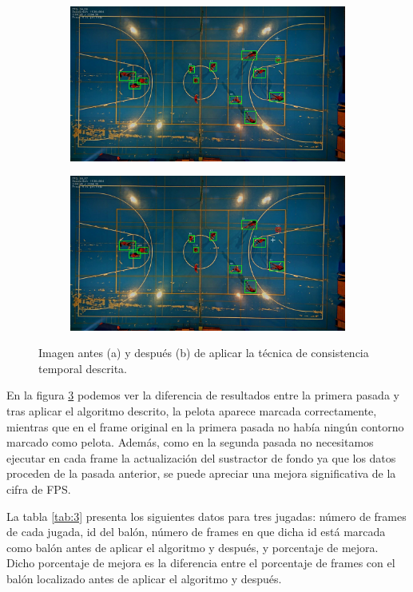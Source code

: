 \begin{figure}
\begin{subfigure}{.5\textwidth}
  \centering
  \includegraphics[width=.9\linewidth]{images/noconsistencia}
  \caption { }
  \label{fig:consa}
\end{subfigure}%
\begin{subfigure}{.5\textwidth}
  \centering
  \includegraphics[width=.9\linewidth]{images/consistencia}
  \caption { }
  \label{fig:consb}
\end{subfigure}
\caption{Imagen antes (a) y después (b) de aplicar la técnica de consistencia temporal descrita.}
\label{fig:cons}
\end{figure}

En la figura \ref{fig:cons} podemos ver la diferencia de resultados entre la primera pasada y tras aplicar el algoritmo descrito, la pelota aparece marcada correctamente, mientras que en el frame original en la primera pasada no había ningún contorno marcado como pelota. Además, como en la segunda pasada no necesitamos ejecutar en cada frame la actualización del sustractor de fondo ya que los datos proceden de la pasada anterior, se puede apreciar una mejora significativa de la cifra de FPS.

La tabla \ref{tab:3} presenta los siguientes datos para tres jugadas: número de frames de cada jugada, id del balón, número de frames en que dicha id está marcada como balón antes de aplicar el algoritmo y después, y porcentaje de mejora. Dicho porcentaje de mejora es la diferencia entre el porcentaje de frames con el balón localizado antes de aplicar el algoritmo y después.


